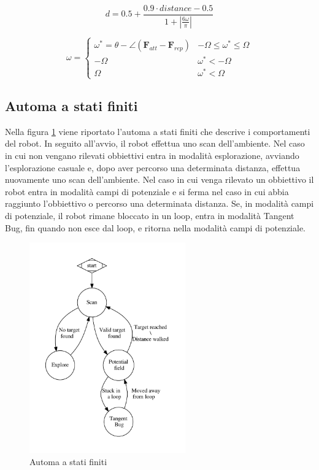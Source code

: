\documentclass[a4paper]{article}
\begin{document}
	\begin{equation}\label{eq:translation}
		d = 0.5 + \frac	{0.9\cdot distance - 0.5}
		{1 + \left|
				\frac{6\omega}{\pi}
		\right|  } 
	\end{equation}
	
	\begin{equation}\label{eq:angle}
		\omega = \begin{cases}
			\omega^*=\theta - \angle\left( \textbf{F}_{att} - \textbf{F}_{rep} \right)  & -\Omega \le \omega^* \le \Omega \\
			-\Omega & \omega^* < -\Omega \\
			\Omega & \omega^* < \Omega

		\end{cases}	\end{equation}
	
	\subsection{Automa a stati finiti}\label{subsec:Pianificazione}
	
	Nella figura \ref{fig:fsa} viene riportato l'automa a stati finiti che
	descrive i comportamenti del robot. In seguito all'avvio, il robot
	effettua uno scan dell'ambiente. Nel caso in cui non vengano rilevati
	obbiettivi entra in modalità esplorazione, avviando l'esplorazione casuale
	e, dopo aver percorso una determinata distanza, effettua nuovamente uno
	scan dell'ambiente. Nel caso in cui venga rilevato un obbiettivo il robot
	entra in modalità campi di potenziale e si ferma nel caso in cui abbia
	raggiunto l'obbiettivo o percorso una determinata distanza. Se, in modalità
	campi di potenziale, il robot rimane bloccato in un loop, entra in
	modalità Tangent Bug, fin quando non esce dal loop, e ritorna nella
	modalità campi di potenziale.
	
	\begin{figure}[H]
		\centering
		\includegraphics[width=0.6\textwidth]{./img/fsa.pdf}
		\caption{Automa a stati finiti }
		\label{fig:fsa}
	\end{figure}
	
\end{document}
